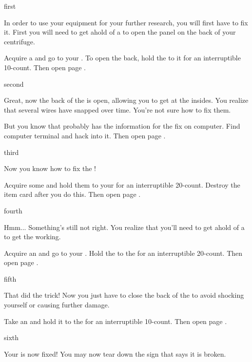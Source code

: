 \documentclass[greennotebook]{guildcamp4} %
\begin{document}
\startnotebook{\nJamesFixLab{}}

\begin{page}{first}

In order to use your equipment for your further research, you will first have to fix it. First you will need to get ahold of a \iWrench{} to open the panel on the back of your centrifuge.

Acquire a \iWrench{} and go to your \sCentrifugeBroken{}. To open the back, hold the \iWrench{} to it for an interruptible 10-count. Then open page .

\end{page}

\begin{page}{second}

Great, now the back of the \sCentrifugeBroken{} is open, allowing you to get at the insides. You realize that several wires have snapped over time. You're not sure how to fix them.

But you know that \cVthree{} probably has the information for the fix on \cVthree{\their} computer. Find \cVthree{\their} computer terminal and hack into it. Then open page .

\end{page}

\begin{page}{third}

Now you know how to fix the \sCentrifugeBroken{}!

Acquire some \iWires{} and hold them to your \sCentrifugeBroken{} for an interruptible 20-count. Destroy the \iWires{} item card after you do this. Then open page .

\end{page}

\begin{page}{fourth}

Hmm... Something's still not right. You realize that you'll need to get ahold of a \iCalibrator{} to get the \sCentrifugeBroken{} working.

Acquire an \iCalibrator{} and go to your \sCentrifugeBroken{}. Hold the \iCalibrator{} to the \sCentrifugeBroken{} for an interruptible 20-count. Then open page .

\end{page}

\begin{page}{fifth}

That did the trick! Now you just have to close the back of the \sCentrifugeBroken{} to avoid shocking yourself or causing further damage.

Take an \iWrench{} and hold it to the \sCentrifugeBroken{} for an interruptible 10-count. Then open page .

\end{page}

\begin{page}{sixth}

Your \sCentrifuge{} is now fixed! You may now tear down the sign that says it is broken.

\end{page}

\endnotebook
\end{document}
